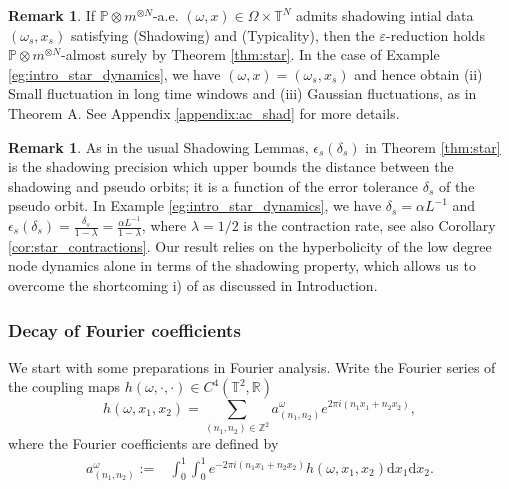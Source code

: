 \documentclass[a4paper]{article}
\theoremstyle{plain}
\theoremstyle{definition}
\newtheorem{rem}[theorem]{Remark}
\newcommand{\PP}{\mathbb{P}}
\newcommand{\R}{\mathbb{R}}
\newcommand{\T}{\mathbb{T}}
\newcommand{\Z}{\mathbb{Z}}
\begin{document}
\begin{rem}
	If $\PP\otimes m^{\otimes N}$-a.e. $(\omega,x)\in\Omega\times \T^N$ admits shadowing intial data $(\omega_{{s}},x_{{s}})$ satisfying (Shadowing) and (Typicality), then the $\varepsilon$-reduction holds $\PP\otimes m^{\otimes N}$-almost surely by Theorem \ref{thm:star}. 
	In the case of Example \ref{eg:intro_star_dynamics}, we have $(\omega,x)= (\omega_{{s}},x_{{s}})$ and hence obtain
	(ii) Small fluctuation in long time windows and (iii) Gaussian fluctuations, as in Theorem A. See Appendix \ref{appendix:ac_shad} for more details.
\end{rem}

\begin{rem}
As in the usual Shadowing Lemmas, $\epsilon_s(\delta_s)$ in Theorem \ref{thm:star} is the shadowing precision which upper bounds the distance between the shadowing and pseudo orbits; it is a function of the error tolerance $\delta_s$ of the pseudo orbit. In Example \ref{eg:intro_star_dynamics}, we have $\delta_s=\alpha L^{-1}$ and $\epsilon_s(\delta_s) = \frac{\delta_s}{1-\lambda}= \frac{\alpha L^{-1}}{1-\lambda}$, where $\lambda=1/2$ is the contraction rate, see also Corollary \ref{cor:star_contractions}. Our result relies on the hyperbolicity of the low degree node dynamics alone in terms of the shadowing property, which allows us to overcome the shortcoming i) of \cite{PvST20} as discussed in Introduction.
\end{rem}







\subsubsection{Decay of Fourier coefficients}
We start with some preparations in Fourier analysis. Write the Fourier series of the coupling maps $h(\omega,\cdot,\cdot)\in C^4(\T^2,\R)$
$$h(\omega,x_1,x_2)= \sum_{(n_1,n_2)\in \Z^2}a^{\omega}_{(n_1,n_2)} e^{2\pi i(n_1x_1+n_2x_2)},$$
where the Fourier coefficients are defined by
\begin{align*}
	a^{\omega}_{(n_1,n_2)}:= &\int_0^1 \int_0^1 e^{-2\pi i(n_1x_1+n_2x_2)} h(\omega,x_1,x_2)\mathrm{d}x_1\mathrm{d}x_2.
\end{align*}
\end{document}

